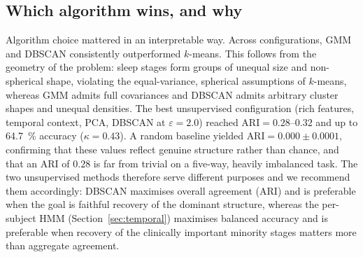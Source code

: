 \documentclass[11pt,a4paper]{article}
\begin{document}
\subsection{Which algorithm wins, and why}
Algorithm choice mattered in an interpretable way. Across configurations, GMM and
DBSCAN consistently outperformed $k$-means. This follows from the geometry of the
problem: sleep stages form groups of unequal size and non-spherical shape,
violating the equal-variance, spherical assumptions of $k$-means, whereas GMM
admits full covariances and DBSCAN admits arbitrary cluster shapes and unequal
densities. The best unsupervised configuration (rich features, temporal context,
PCA, DBSCAN at $\varepsilon=2.0$) reached $\text{ARI}=0.28$--$0.32$ and up to
\SI{64.7}{\percent} accuracy ($\kappa=0.43$). A random baseline yielded
$\text{ARI}=0.000\pm0.0001$, confirming that these values reflect genuine structure
rather than chance, and that an ARI of $0.28$ is far from trivial on a five-way,
heavily imbalanced task. The two unsupervised methods therefore serve different
purposes and we recommend them accordingly: DBSCAN maximises overall agreement
(ARI) and is preferable when the goal is faithful recovery of the dominant
structure, whereas the per-subject HMM (Section~\ref{sec:temporal}) maximises
balanced accuracy and is preferable when recovery of the clinically important
minority stages matters more than aggregate agreement.
\end{document}
